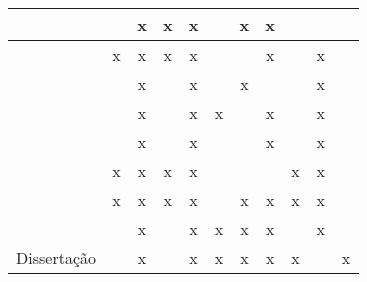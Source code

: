 \begin{table}[]
\begin{tabular}{|c|c|c|c|c|c|c|c|c|c|c|}
    \cite{11}       &  ~        & x         & x         & x         &  ~            & x     & x     & ~             & ~         & ~             \\ \hline
    \cite{32.31}    & x         & x         & x         & x         &  ~            & ~     & x     & ~             & x         & ~             \\ \hline
    \cite{32.25}    &  ~        & x         &  ~        & x         &  ~            & x     & ~     & ~             & x         & ~             \\ \hline
    \cite{34}       &  ~        & x         &  ~        & x         & x             & ~     & x     & ~             & x         & ~             \\ \hline
    \cite{32.95}    &  ~        & x         &  ~        & x         &  ~            & ~     & x     & ~             & x         & ~             \\ \hline
    \cite{12}       & x         & x         & x         & x         &  ~            & ~     & ~     & x             & x         & ~             \\ \hline
    \cite{21}       & x         & x         & x         & x         &  ~            & x     & x     & x             & x         & ~             \\ \hline
    \cite{pca6}    & ~         & x         & ~         & x         & x             & x     & x     & ~             & x         & ~             \\ \hline
    Dissertação     & ~         & x         & ~         & x         & x             & x     & x     & x             & ~         & x             \\ \hline
    \end{tabular}\label{table:discussao}
\end{table}


